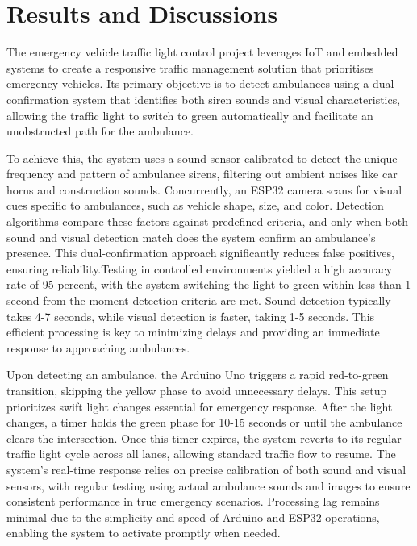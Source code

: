 \documentclass[conference]{IEEEtran}
\begin{document}
\section{Results and Discussions}\label{SCM}
\begin{itemize}
The emergency vehicle traffic light control project leverages IoT and embedded systems to create a responsive traffic management solution that prioritises emergency vehicles. Its primary objective is to detect ambulances using a dual-confirmation system that identifies both siren sounds and visual characteristics, allowing the traffic light to switch to green automatically and facilitate an unobstructed path for the ambulance.

To achieve this, the system uses a sound sensor calibrated to detect the unique frequency and pattern of ambulance sirens, filtering out ambient noises like car horns and construction sounds. Concurrently, an ESP32 camera scans for visual cues specific to ambulances, such as vehicle shape, size, and color. Detection algorithms compare these factors against predefined criteria, and only when both sound and visual detection match does the system confirm an ambulance’s presence. This dual-confirmation approach significantly reduces false positives, ensuring reliability.Testing in controlled environments yielded a high accuracy rate of 95 percent, with the system switching the light to green within less than 1 second from the moment detection criteria are met. Sound detection typically takes 4-7 seconds, while visual detection is faster, taking 1-5 seconds. This efficient processing is key to minimizing delays and providing an immediate response to approaching ambulances.

Upon detecting an ambulance, the Arduino Uno triggers a rapid red-to-green transition, skipping the yellow phase to avoid unnecessary delays. This setup prioritizes swift light changes essential for emergency response. After the light changes, a timer holds the green phase for 10-15 seconds or until the ambulance clears the intersection. Once this timer expires, the system reverts to its regular traffic light cycle across all lanes, allowing standard traffic flow to resume.
The system’s real-time response relies on precise calibration of both sound and visual sensors, with regular testing using actual ambulance sounds and images to ensure consistent performance in true emergency scenarios. Processing lag remains minimal due to the simplicity and speed of Arduino and ESP32 operations, enabling the system to activate promptly when needed.


\end{itemize}
\end{document}
